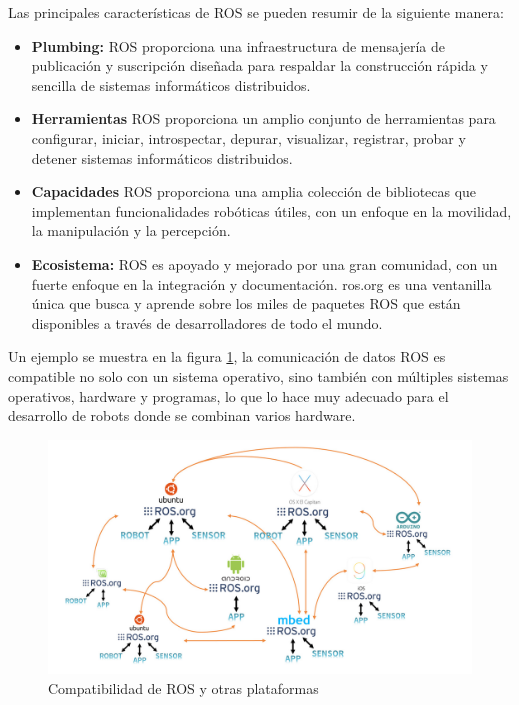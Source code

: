         \newpage
        
        Las principales características de ROS se pueden resumir de la siguiente manera:
        
        \begin{itemize}
            \item \textbf{Plumbing:} ROS proporciona una infraestructura de mensajería de publicación y suscripción diseñada para respaldar la construcción rápida y sencilla de sistemas informáticos distribuidos.
            \item \textbf{Herramientas} ROS proporciona un amplio conjunto de herramientas para configurar, iniciar, introspectar, depurar, visualizar, registrar, probar y detener sistemas informáticos distribuidos.
            \item \textbf{Capacidades} ROS proporciona una amplia colección de bibliotecas que implementan funcionalidades robóticas útiles, con un enfoque en la movilidad, la manipulación y la percepción.
            \item \textbf{Ecosistema:} ROS es apoyado y mejorado por una gran comunidad, con un fuerte enfoque en la integración y documentación. ros.org es una ventanilla única que busca y aprende sobre los miles de paquetes ROS que están disponibles a través de desarrolladores de todo el mundo.
        \end{itemize}

        Un ejemplo se muestra en la figura \ref{f:Cap3-4_compatibilidad_ros}, la comunicación de datos ROS es compatible no solo con un sistema operativo, sino también con múltiples sistemas operativos, hardware y programas, lo que lo hace muy adecuado para el desarrollo de robots donde se combinan varios hardware. 
        
        \begin{figure}[htb]
            \centering
            \includegraphics[width=1.0\linewidth]{Main/Chapter3/Images3/3-4/compatibilidad-ros.png}
            \caption{Compatibilidad de ROS y otras plataformas}
            \label{f:Cap3-4_compatibilidad_ros}
        \end{figure}
        
